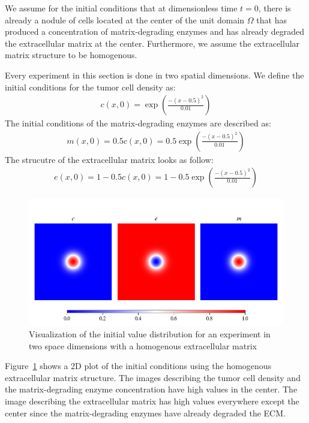 We assume for the initial conditions that at dimensionless time $t=0$, there is already a nodule of cells located at the center of the unit domain $\Omega$ that has produced a concentration of matrix-degrading enzymes and has already degraded the extracellular matrix at the center. Furthermore, we assume the extracellular matrix structure to be homogenous.

Every experiment in this section is done in two spatial dimensions.
We define the initial conditions for the tumor cell density as:
\begin{align*}
    c(x,0)= \exp(\frac{-(x-0.5)^2}{0.01})
\end{align*}
The initial conditions of the matrix-degrading enzymes are described as:
\begin{align*}
    m(x,0) = 0.5 c(x,0) = 0.5 \exp(\frac{-(x-0.5)^2}{0.01})
\end{align*}
The strucutre of the extracellular matrix looks as follow:
\begin{align*}
    e(x,0) = 1 - 0.5 c(x,0) = 1 - 0.5 \exp(\frac{-(x-0.5)^2}{0.01})
\end{align*}
\begin{figure}[ht!]
    \centering
    \includegraphics[width=\textwidth]{resources/images/2D_initial_conditions_homogenous_ECM.png}
    \caption{Visualization of the initial value distribution for an experiment in two space dimensions with a homogenous extracellular matrix}
    \label{fig:2D_homogenous_ECM_initial}
\end{figure}
Figure~\ref{fig:2D_homogenous_ECM_initial} shows a 2D plot of the initial conditions using the homogenous extracellular matrix structure. The images describing the tumor cell density and the matrix-degrading enzyme concentration have high values in the center. The image describing the extracellular matrix has high values everywhere except the center since the matrix-degrading enzymes have already degraded the ECM.

